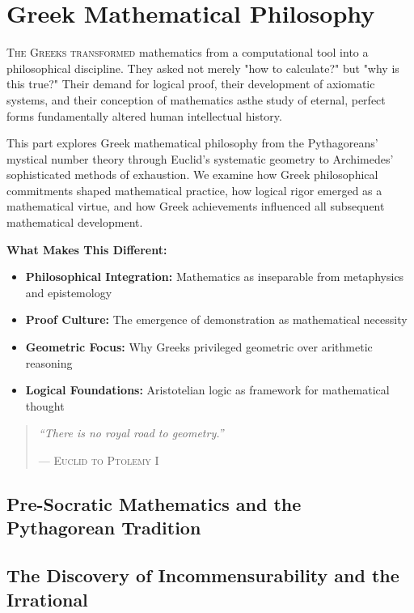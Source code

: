 
\part{Greek Mathematical Philosophy}
\label{part:greek-mathematics}

\begin{partintro}
\lettrine[lines=3]{T}{he Greeks transformed} mathematics from a computational tool into a philosophical discipline. They asked not merely "how to calculate?" but "why is this true?" Their demand for logical proof, their development of axiomatic systems, and their conception of mathematics asthe study of eternal, perfect forms fundamentally altered human intellectual history.

This part explores Greek mathematical philosophy from the Pythagoreans' mystical number theory through Euclid's systematic geometry to Archimedes' sophisticated methods of exhaustion. We examine how Greek philosophical commitments shaped mathematical practice, how logical rigor emerged as a mathematical virtue, and how Greek achievements influenced all subsequent mathematical development.

\vspace{1em}
\textbf{What Makes This Different:}
\begin{itemize}[noitemsep]
    \item \textbf{Philosophical Integration:} Mathematics as inseparable from metaphysics and epistemology
    \item \textbf{Proof Culture:} The emergence of demonstration as mathematical necessity
    \item \textbf{Geometric Focus:} Why Greeks privileged geometric over arithmetic reasoning
    \item \textbf{Logical Foundations:} Aristotelian logic as framework for mathematical thought
\end{itemize}

\begin{quote}
\textit{``There is no royal road to geometry.''}

\hfill--- \textsc{Euclid to Ptolemy I}
\end{quote}
\end{partintro}

\chapter{ Pre-Socratic Mathematics and the Pythagorean Tradition  }
\chapter{ The Discovery of Incommensurability and the Irrational  }
